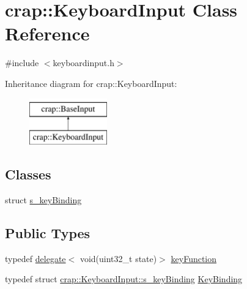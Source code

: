 \hypertarget{classcrap_1_1_keyboard_input}{}\section{crap\+:\+:Keyboard\+Input Class Reference}
\label{classcrap_1_1_keyboard_input}


{\ttfamily \#include $<$keyboardinput.\+h$>$}

Inheritance diagram for crap\+:\+:Keyboard\+Input\+:\begin{figure}[H]
\begin{center}
\leavevmode
\includegraphics[height=2.000000cm]{classcrap_1_1_keyboard_input}
\end{center}
\end{figure}
\subsection*{Classes}
\begin{DoxyCompactItemize}
\item 
struct \hyperlink{structcrap_1_1_keyboard_input_1_1s__key_binding}{s\+\_\+key\+Binding}
\end{DoxyCompactItemize}
\subsection*{Public Types}
\begin{DoxyCompactItemize}
\item 
typedef \hyperlink{classcrap_1_1delegate}{delegate}$<$ void(uint32\+\_\+t state)$>$ \hyperlink{classcrap_1_1_keyboard_input_a65627167afa075a37fa85b21b5e9fb0b}{key\+Function}
\item 
typedef struct \hyperlink{structcrap_1_1_keyboard_input_1_1s__key_binding}{crap\+::\+Keyboard\+Input\+::s\+\_\+key\+Binding} \hyperlink{classcrap_1_1_keyboard_input_aded4eebea0fea50b5244242f241c384c}{Key\+Binding}
\end{DoxyCompactItemize}
